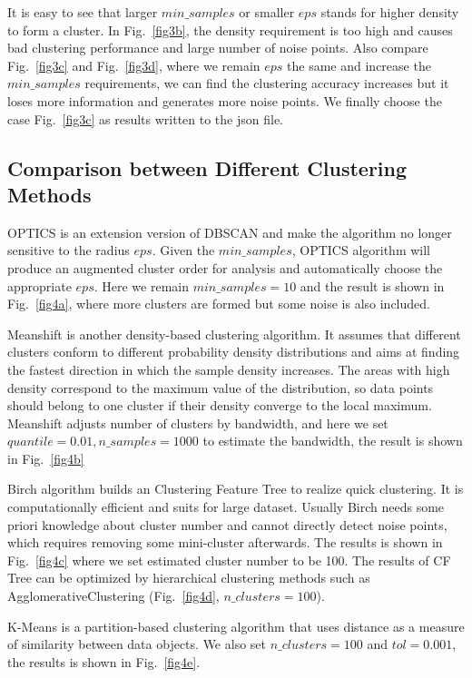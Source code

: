 \documentclass[8pt]{article}
\theoremstyle{nonumberplain}
\begin{document}
It is easy to see that larger $min\_samples$ or smaller $eps$ stands for higher density to form a cluster. In Fig.~\ref{fig3b}, the density requirement is too high and causes bad clustering performance and large number of noise points. Also compare Fig.~\ref{fig3c} and Fig.~\ref{fig3d}, where we remain $eps$ the same and increase the $min\_samples$ requirements, we can find the clustering accuracy increases but it loses more information and generates more noise points. We finally choose the case Fig.~\ref{fig3c} as results written to the json file.

\subsection{Comparison between Different Clustering Methods}

\hspace{1.0em}
OPTICS is an extension version of DBSCAN and make the algorithm no longer sensitive to the radius $eps$. Given the $min\_samples$, OPTICS algorithm will produce an augmented cluster order for analysis and automatically choose the appropriate $eps$. Here we remain $min\_samples=10$ and the result is shown in Fig.~\ref{fig4a}, where more clusters are formed but some noise is also included.

Meanshift is another density-based clustering algorithm. It assumes that different clusters conform to different probability density distributions and aims at finding the fastest direction in which the sample density increases. The areas with high density correspond to the maximum value of the distribution, so data points should belong to one cluster if their density converge to the local maximum. Meanshift adjusts number of clusters by bandwidth, and here we set $quantile=0.01, n\_samples=1000$ to estimate the bandwidth, the result is shown in Fig.~\ref{fig4b} 

Birch algorithm builds an Clustering Feature Tree to realize quick clustering. It is computationally efficient and suits for large dataset. Usually Birch needs some priori knowledge about cluster number and cannot directly detect noise points, which requires removing some mini-cluster afterwards. The results is shown in Fig.~\ref{fig4c} where we set estimated cluster number to be 100. The results of CF Tree can be optimized by hierarchical clustering methods such as AgglomerativeClustering (Fig.~\ref{fig4d}, $n\_clusters=100$). 

K-Means is a partition-based clustering algorithm that uses distance as a measure of similarity between data objects. We also set $n\_clusters=100$ and $tol=0.001$, the results is shown in Fig.~\ref{fig4e}.
\end{document}
